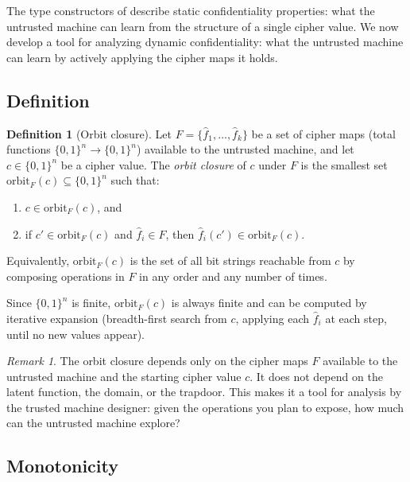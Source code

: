\documentclass[11pt]{article}
\theoremstyle{definition}
\newtheorem{definition}{Definition}[section]
\theoremstyle{plain}
\theoremstyle{remark}
\newtheorem{remark}{Remark}[section]
\newcommand{\fhat}{\hat{f}}
\newcommand{\orbitF}{\mathrm{orbit}_F}
\newcommand{\B}{\{0,1\}}
\begin{document}
The type constructors of  describe static confidentiality
properties: what the untrusted machine can learn from the structure of a
single cipher value.
We now develop a tool for analyzing dynamic confidentiality: what the
untrusted machine can learn by actively applying the cipher maps it holds.


\subsection{Definition}
\label{sec:orbit-def}

\begin{definition}[Orbit closure]
\label{def:orbit}
Let $F = \{\fhat_1, \ldots, \fhat_k\}$ be a set of cipher maps
(total functions $\B^n \to \B^n$) available to the untrusted machine,
and let $c \in \B^n$ be a cipher value.
The \emph{orbit closure} of $c$ under $F$ is the smallest set
$\orbitF(c) \subseteq \B^n$ such that:
\begin{enumerate}
\item $c \in \orbitF(c)$, and
\item if $c' \in \orbitF(c)$ and $\fhat_i \in F$, then
  $\fhat_i(c') \in \orbitF(c)$.
\end{enumerate}
Equivalently, $\orbitF(c)$ is the set of all bit strings reachable from
$c$ by composing operations in $F$ in any order and any number of times.
\end{definition}

Since $\B^n$ is finite, $\orbitF(c)$ is always finite and can be computed
by iterative expansion (breadth-first search from $c$, applying each
$\fhat_i$ at each step, until no new values appear).

\begin{remark}
\label{rem:orbit-indep}
The orbit closure depends only on the cipher maps $F$ available to the
untrusted machine and the starting cipher value $c$.
It does not depend on the latent function, the domain, or the trapdoor.
This makes it a tool for analysis by the trusted machine designer: given
the operations you plan to expose, how much can the untrusted machine
explore?
\end{remark}


\subsection{Monotonicity}
\label{sec:monotonicity}
\end{document}

